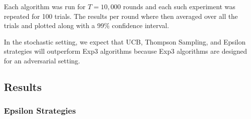 \documentclass[12pt]{article}
\begin{document}
Each algorithm was run for $T = 10,000$ rounds and each such experiment was repeated for 100 trials. The results per round where then averaged over all the trials and plotted along with a 99\% confidence interval.

In the stochastic setting, we expect that UCB, Thompson Sampling, and Epsilon strategies will outperform Exp3 algorithms because Exp3 algorithms are designed for an adversarial setting.

\subsection{Results}

\subsubsection{Epsilon Strategies}
\end{document}
